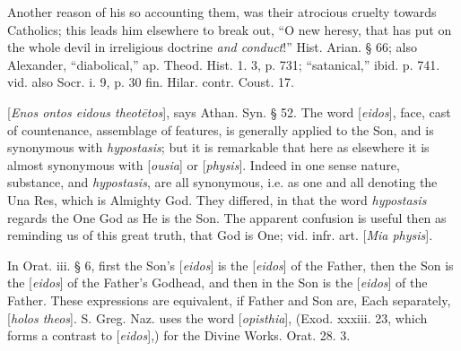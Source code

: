 Another reason of his so accounting them, was
their atrocious cruelty towards Catholics; this leads him elsewhere to
break out, “O new heresy, that has put on the whole devil in
irreligious doctrine \emph{and conduct}!” Hist. Arian. § 66; also
Alexander, “diabolical,” ap. Theod. Hist. 1. 3, p. 731; “satanical,”
ibid. p. 741. vid. also Socr. i. 9, p. 30 fin. Hilar. contr. Coust.
17.

\xsection{[Eidos]}

[\emph{Enos ontos eidous theot\={e}tos}], says
Athan. Syn. § 52. The word [\emph{eidos}], face, cast of countenance,
assemblage of features, is generally applied to the Son, and is
synonymous with \emph{hypostasis}; but it is remarkable that here as
elsewhere it is almost synonymous with [\emph{ousia}] or [\emph{physis}].
Indeed in one sense nature, substance, and \emph{hypostasis}, are all
synonymous, i.e. as one and all denoting the Una Res, which is
Almighty God. They differed, in that the word \emph{hypostasis}
regards the One God as He is the Son. The apparent confusion is useful
then as reminding us of this great truth, that God is One; vid. infr.
art. [\emph{Mia physis}].

In Orat. iii. § 6, first the Son’s [\emph{eidos}]
is the [\emph{eidos}] of the Father, then the Son is the [\emph{eidos}]
of the Father’s Godhead, and then in the Son is the [\emph{eidos}]
of the Father. These expressions are equivalent, if Father and Son
are, Each separately, [\emph{holos theos}]. S. Greg. Naz. uses the
word [\emph{opisthia}], (Exod. xxxiii. 23, which forms a contrast to [\emph{eidos}],)
for the Divine Works. Orat. 28. 3.

